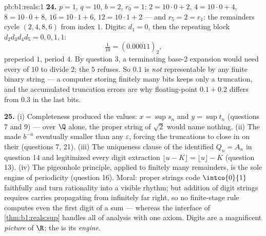 \begin{solution}{pb:b1:reals:1}
\textbf{24.} $p = 1$, $q = 10$, $b = 2$, $r_0 = 1$: $2 = 10 \cdot
0 + 2$, $4 = 10 \cdot 0 + 4$, $8 = 10 \cdot 0 + 8$, $16 = 10
\cdot 1 + 6$, $12 = 10 \cdot 1 + 2$ --- and $r_5 = 2 = r_1$: the
remainders cycle $(2, 4, 8, 6)$ from index $1$. Digits: $d_1 =
0$, then the repeating block $d_2 d_3 d_4 d_5 = 0, 0, 1, 1$:
\[
\tfrac{1}{10} = (0.0\overline{0011})_2 ,
\]
preperiod $1$, period $4$. By question 3, a terminating base-$2$
expansion would need every  of $10$ to divide $2$; the 
$5$ refuses. So $0.1$ is \emph{not} representable by any finite
binary string --- a computer storing finitely many bits keeps
only a truncation, and the accumulated truncation errors are why
floating-point $0.1 + 0.2$ differs from $0.3$ in the last bits.

\textbf{25.} (i) Completeness produced the values: $x = \sup s_n$
and $y = \sup t_n$ (questions 7 and 9) --- over $\Q$ alone, the
proper string of $\sqrt 2$ would name nothing. (ii) The
 made $b^{-n}$ eventually smaller than any
$\varepsilon$, forcing the truncations to close in on their
 (questions 7, 21). (iii) The uniqueness clause of the
 identified $Q_n = A_n$ in question 14 and legitimized every
digit extraction $\lfloor u - K \rfloor = \lfloor u \rfloor - K$
(question 13). (iv) The pigeonhole principle, applied to finitely
many remainders, is the sole engine of periodicity (question 16).
Moral: proper strings code $\intco{0}{1}$ faithfully and turn
rationality into a visible rhythm; but addition of digit strings
requires carries propagating from infinitely far right, so no
finite-stage rule computes even the first digit of a sum ---
whereas the  interface of \cref{thm:b1:reals:sup} handles
all of analysis with one axiom. Digits are a magnificent
\emph{picture} of $\R$; the  is its \emph{engine}.
\end{solution}
